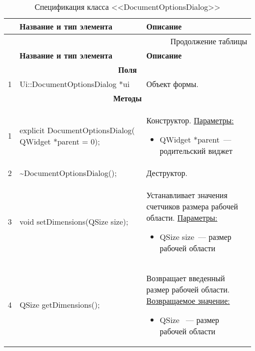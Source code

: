 \small
\singlespacing
\begin{longtable}[h]{|p{}|p{}|p{}|}
  \caption{Спецификация класса <<DocumentOptionsDialog>>}
	\\ \hline
	  \textbf{\No}                  &
	  \textbf{Название и тип элемента}  &
	  \textbf{Описание}
	\\ \hline
  \endfirsthead

  \multicolumn{3}{r}{Продолжение таблицы \thetable{}}
  \\ \hline
	  \textbf{\No}                  &
	  \textbf{Название и тип элемента}  &
	  \textbf{Описание}
	\\ \hline
  \endhead

  \multicolumn{3}{|c|}{\textbf{Поля}} \\
  \hline
  1 & Ui::DocumentOptionsDialog *ui & Объект формы. \\ \hline

  \multicolumn{3}{|c|}{\textbf{Методы}} \\
  \hline
  1 & explicit DocumentOptionsDialog( QWidget *parent = 0); &
    Конструктор.\newline
    \uline{Параметры:}
    \begin{itemize}[nolistsep,label=,leftmargin=0cm]
      \item QWidget *parent~--- родительский виджет
    \end{itemize}\\ \hline
  2 & \textasciitilde DocumentOptionsDialog(); & Деструктор. \\ \hline
  3 & void setDimensions(QSize size); & Устанавливает значения счетчиков размера рабочей области.\newline
    \uline{Параметры:}
    \begin{itemize}[nolistsep,label=,leftmargin=0cm]
      \item QSize size~--- размер рабочей области
    \end{itemize}\\ \hline
  4 & QSize getDimensions(); & Возвращает введенный размер рабочей области.\newline
    \uline{Возвращаемое значение:}
    \begin{itemize}[nolistsep,label=,leftmargin=0cm]
      \item QSize ~--- размер рабочей области
    \end{itemize}\\ \hline
\end{longtable}
\normalsize
\onehalfspacing


